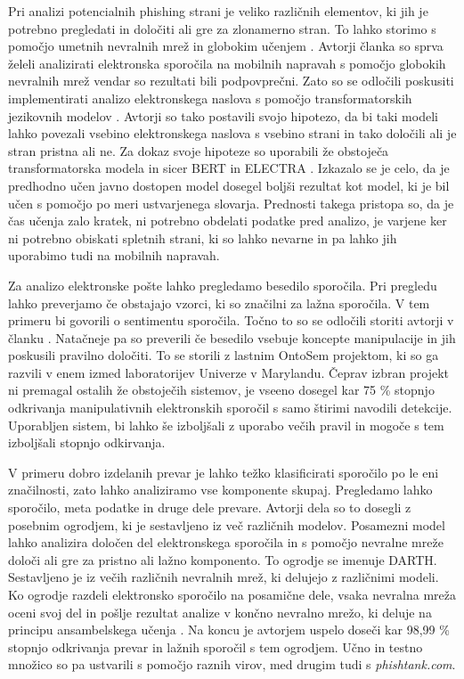 \documentclass[sigconf,nonacm]{acmart}
\begin{document}
Pri analizi potencialnih phishing \cite{rekouche2011early} strani je veliko različnih elementov, ki jih je potrebno pregledati in določiti ali gre za zlonamerno stran. To lahko storimo s pomočjo umetnih nevralnih mrež \cite{Zou2009} in globokim učenjem \cite{lecun2015deep}. Avtorji članka \cite{HAYNES2021127} so sprva želeli analizirati elektronska sporočila na mobilnih napravah s pomočjo globokih nevralnih mrež vendar so rezultati bili podpovprečni. Zato so se odločili poskusiti implementirati analizo elektronskega naslova s pomočjo transformatorskih jezikovnih modelov \cite{9222960}. Avtorji so tako postavili svojo hipotezo, da bi taki modeli lahko povezali vsebino elektronskega naslova s vsebino strani in tako določili ali je stran pristna ali ne.  Za dokaz svoje hipoteze so uporabili že obstoječa transformatorska modela in sicer BERT \cite{devlin2018bert} in ELECTRA \cite{clark2020electra}. Izkazalo se je celo, da je predhodno učen javno dostopen model dosegel boljši rezultat kot model, ki je bil učen s pomočjo po meri ustvarjenega slovarja. Prednosti takega pristopa so, da je čas učenja zalo kratek, ni potrebno obdelati podatke pred analizo, je varjene ker ni potrebno obiskati spletnih strani, ki so lahko nevarne in pa lahko jih uporabimo tudi na mobilnih napravah. 

Za analizo elektronske pošte lahko pregledamo besedilo sporočila. Pri pregledu lahko preverjamo če obstajajo vzorci, ki so značilni za lažna sporočila. V tem primeru bi govorili o sentimentu sporočila. Točno to so se odločili storiti avtorji v članku \cite{stone2007ebids}. Natačneje pa so preverili če besedilo vsebuje koncepte manipulacije in jih poskusili pravilno določiti. To se storili z lastnim OntoSem projektom, ki so ga razvili v enem izmed laboratorijev Univerze v Marylandu. Čeprav izbran projekt ni premagal ostalih že obstoječih sistemov, je vseeno dosegel kar 75 \% stopnjo odkrivanja manipulativnih elektronskih sporočil s samo štirimi navodili detekcije. Uporabljen sistem, bi lahko še izboljšali z uporabo večih pravil in mogoče s tem izboljšali stopnjo odkirvanja. 

V primeru dobro izdelanih prevar je lahko težko klasificirati sporočilo po le eni značilnosti, zato lahko analiziramo vse komponente skupaj. Pregledamo lahko sporočilo, meta podatke in druge dele prevare. Avtorji dela \cite{mittal2022phishing} so to dosegli z posebnim ogrodjem, ki je sestavljeno iz več različnih modelov. Posamezni model lahko analizira določen del elektronskega sporočila in s pomočjo nevralne mreže določi ali gre za pristno ali lažno komponento. To ogrodje se imenuje DARTH. Sestavljeno je iz večih različnih nevralnih mrež, ki delujejo z različnimi modeli. Ko ogrodje razdeli elektronsko sporočilo na posamične dele, vsaka nevralna mreža oceni svoj del in pošlje rezultat analize v končno nevralno mrežo, ki deluje na principu ansambelskega učenja \cite{682375}. Na koncu je avtorjem uspelo doseči kar 98,99 \% stopnjo odkrivanja prevar in lažnih sporočil s tem ogrodjem. Učno in testno množico so pa ustvarili s pomočjo raznih virov, med drugim tudi s \emph{phishtank.com}.




\end{document}
